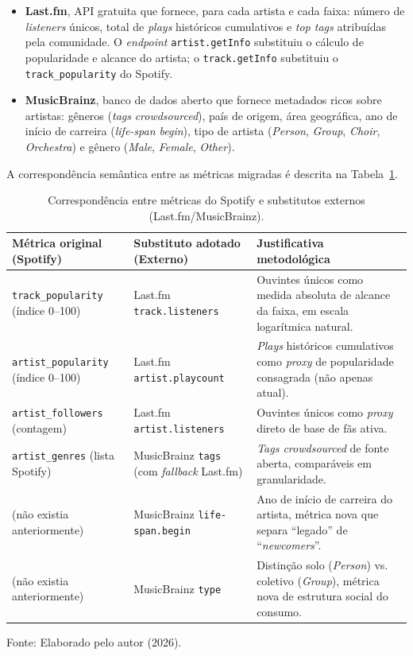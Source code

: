 \documentclass[12pt, %
openright,
oneside, %
a4paper,    %
english,   %
brazil]{facom-ufu-abntex2}
\newcommand{\fontefig}[1]{%
  \par\nopagebreak\vspace{0.15cm}%
  {\centering\footnotesize Fonte: #1\par}%
}
\begin{document}
\begin{itemize}
  \item \textbf{Last.fm}, API gratuita que fornece, para cada artista e cada
  faixa: número de \emph{listeners} únicos, total de \emph{plays} históricos
  cumulativos e \emph{top tags} atribuídas pela comunidade. O \emph{endpoint}
  \texttt{artist.getInfo} substituiu o cálculo de popularidade e alcance do
  artista; o \texttt{track.getInfo} substituiu o \texttt{track\_popularity} do
  Spotify.

  \item \textbf{MusicBrainz}, banco de dados aberto que fornece metadados
  ricos sobre artistas: gêneros (\emph{tags} \emph{crowdsourced}), país de
  origem, área geográfica, ano de início de carreira (\emph{life-span begin}),
  tipo de artista (\emph{Person}, \emph{Group}, \emph{Choir}, \emph{Orchestra}) e
  gênero (\emph{Male}, \emph{Female}, \emph{Other}).
\end{itemize}

A correspondência semântica entre as métricas migradas é descrita na
Tabela~\ref{tab:correspondencia}.

\begin{table}[H]
\centering
\caption[Correspondência entre métricas do Spotify e substitutos externos]{Correspondência entre métricas do Spotify e substitutos externos (Last.fm/MusicBrainz).}
\label{tab:correspondencia}
\footnotesize
\begin{tabularx}{\textwidth}{>{\raggedright\arraybackslash}p{3.4cm} >{\raggedright\arraybackslash}p{3.6cm} X}
\toprule
\textbf{Métrica original (Spotify)} & \textbf{Substituto adotado (Externo)} & \textbf{Justificativa metodológica} \\
\midrule
\texttt{track\_popularity} (índice 0--100) & Last.fm \texttt{track.listeners} & Ouvintes únicos como medida absoluta de alcance da faixa, em escala logarítmica natural. \\
\texttt{artist\_popularity} (índice 0--100) & Last.fm \texttt{artist.playcount} & \emph{Plays} históricos cumulativos como \emph{proxy} de popularidade consagrada (não apenas atual). \\
\texttt{artist\_followers} (contagem) & Last.fm \texttt{artist.listeners} & Ouvintes únicos como \emph{proxy} direto de base de fãs ativa. \\
\texttt{artist\_genres} (lista Spotify) & MusicBrainz \texttt{tags} (com \emph{fallback} Last.fm) & \emph{Tags crowdsourced} de fonte aberta, comparáveis em granularidade. \\
(não existia anteriormente) & MusicBrainz \texttt{life-span.begin} & Ano de início de carreira do artista, métrica nova que separa ``legado'' de ``\emph{newcomers}''. \\
(não existia anteriormente) & MusicBrainz \texttt{type} & Distinção solo (\emph{Person}) vs. coletivo (\emph{Group}), métrica nova de estrutura social do consumo. \\
\bottomrule
\end{tabularx}
\fontefig{Elaborado pelo autor (2026).}
\end{table}
\end{document}
